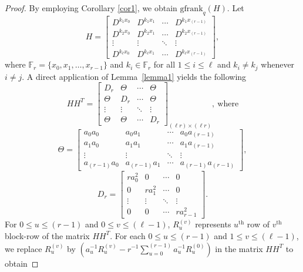 \documentclass[conference]{IEEEtran}
\begin{document}
\begin{proof}
By employing Corollary \ref{cor1}, we obtain $\mathrm{gfrank}_{q}(H)$. Let
\begin{equation*}
    H=\begin{bmatrix}        D^{k_{1}x_{0}}&D^{k_{1}x_{1}}&\cdots&D^{k_{1}x_{(r-1)}}\\
    D^{k_{2}x_{0}}&D^{k_{2}x_{1}}&\cdots&D^{k_{2}x_{(r-1)}}\\
    \vdots&\vdots&\ddots&\vdots\\
    D^{k_{\ell}x_{0}}&D^{k_{\ell}x_{1}}&\cdots&D^{k_{\ell}x_{(r-1)}}
    \end{bmatrix},
\end{equation*}
where $\mathbb{F}_{r}=\{x_{0},x_{1},\ldots,x_{r-1}\}$ and $k_{i}\in\mathbb{F}_{r}$ for all $1\leq i\leq \ell$ and $k_{i}\neq k_{j}$ whenever $i\neq j$. A direct application of Lemma~\ref{lemma1} yields the following
\begin{equation}
   HH^{T}= \begin{bmatrix}
    D_{r}&\Theta&\cdots&\Theta\\
     \Theta&D_{r}&\cdots&\Theta\\
      \vdots&\vdots&\ddots&\vdots\\
       \Theta&\Theta&\cdots&D_{r}
\end{bmatrix}_{(\ell r)\times (\ell r)},~ \text{where}
\end{equation}
 \begin{equation*}
   \Theta= \begin{bmatrix}
        a_{0}a_{0} & a_{0}a_{1} & \cdots & a_{0}a_{(r-1)}\\
        a_{1}a_{0} & a_{1}a_{1}& \cdots & a_{1}a_{(r-1)}\\
        \vdots & \vdots& \ddots & \vdots\\
        a_{(r-1)}a_{0} & a_{(r-1)}a_{1}& \cdots & a_{(r-1)}a_{(r-1)}
    \end{bmatrix}, 
\end{equation*}
\begin{equation*}
   D_{r}= \begin{bmatrix}
        ra_{0}^{2} & 0& \cdots & 0\\
        0 & ra_{1}^{2}& \cdots & 0\\
        \vdots & \vdots& \ddots & \vdots\\
        0 & 0& \cdots & ra_{r-1}^{2}
    \end{bmatrix}.
\end{equation*}
For $0\leq u\leq (r-1)$ and $0 \leq v\leq (\ell-1)$,  $R_{u}^{(v)}$ represents $u^{\mathrm{th}}$ row of $v^{\mathrm{th}}$  block-row of the matrix $HH^{T}$. For each $0\leq u\leq (r-1)$ and $1 \leq v\leq (\ell-1)$, we replace $R_{u}^{(v)}$  by $(a_{u}^{-1}R_{u}^{(v)}-r^{-1}\sum_{u=0}^{(r-1)}a_{u}^{-1}R_{u}^{(0)})$ in the matrix $HH^{T}$ to obtain 

\end{proof}
\end{document}
